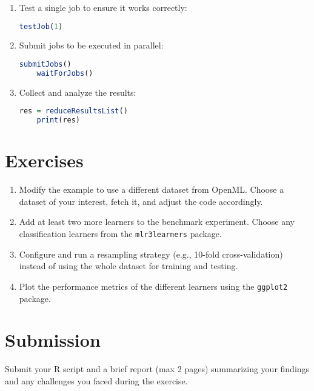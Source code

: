 \documentclass[a4paper,11pt]{article}
\begin{document}
\begin{enumerate}
    \item Test a single job to ensure it works correctly:
    \begin{lstlisting}[language=R]
    testJob(1)
    \end{lstlisting}

    \item Submit jobs to be executed in parallel:
    \begin{lstlisting}[language=R]
    submitJobs()
    waitForJobs()
    \end{lstlisting}

    \item Collect and analyze the results:
    \begin{lstlisting}[language=R]
    res = reduceResultsList()
    print(res)
    \end{lstlisting}
\end{enumerate}

\section*{Exercises}
\begin{enumerate}
    \item Modify the example to use a different dataset from OpenML. Choose a dataset of your interest, fetch it, and adjust the code accordingly.
    \item Add at least two more learners to the benchmark experiment. Choose any classification learners from the \texttt{mlr3learners} package.
    \item Configure and run a resampling strategy (e.g., 10-fold cross-validation) instead of using the whole dataset for training and testing.
    \item Plot the performance metrics of the different learners using the \texttt{ggplot2} package.
\end{enumerate}

\section*{Submission}
Submit your R script and a brief report (max 2 pages) summarizing your findings and any challenges you faced during the exercise.
\end{document}

